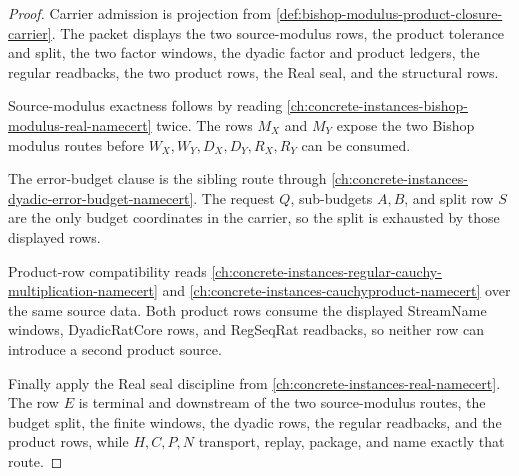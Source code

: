 \begin{proof}
Carrier admission is projection from \autoref{def:bishop-modulus-product-closure-carrier}. The packet displays the two source-modulus rows, the product tolerance and split, the two factor windows, the dyadic factor and product ledgers, the regular readbacks, the two product rows, the Real seal, and the structural rows.

Source-modulus exactness follows by reading \autoref{ch:concrete-instances-bishop-modulus-real-namecert} twice. The rows $M_X$ and $M_Y$ expose the two Bishop modulus routes before $W_X,W_Y,D_X,D_Y,R_X,R_Y$ can be consumed.

The error-budget clause is the sibling route through \autoref{ch:concrete-instances-dyadic-error-budget-namecert}. The request $Q$, sub-budgets $A,B$, and split row $S$ are the only budget coordinates in the carrier, so the split is exhausted by those displayed rows.

Product-row compatibility reads \autoref{ch:concrete-instances-regular-cauchy-multiplication-namecert} and \autoref{ch:concrete-instances-cauchyproduct-namecert} over the same source data. Both product rows consume the displayed StreamName windows, DyadicRatCore rows, and RegSeqRat readbacks, so neither row can introduce a second product source.

Finally apply the Real seal discipline from \autoref{ch:concrete-instances-real-namecert}. The row $E$ is terminal and downstream of the two source-modulus routes, the budget split, the finite windows, the dyadic rows, the regular readbacks, and the product rows, while $H,C,P,N$ transport, replay, package, and name exactly that route.
\end{proof}


